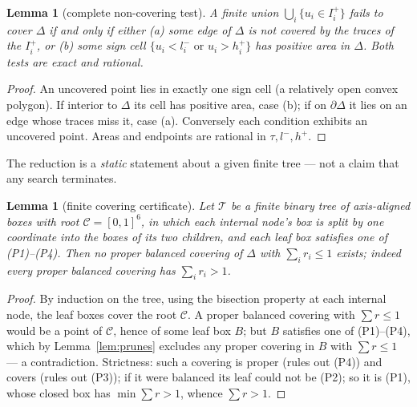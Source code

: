 \documentclass{aims}
\numberwithin{equation}{section}
\theoremstyle{plain}
\newtheorem{lemma}[theorem]{Lemma}
\theoremstyle{definition}
\theoremstyle{remark}
\begin{document}
\begin{lemma}[complete non-covering test]\label{lem:noncover}
A finite union $\bigcup_i\{u_i\in I_i^+\}$ fails to cover $\Delta$ if and only
if either \textup{(a)} some edge of $\Delta$ is not covered by the traces of
the $I_i^+$, or \textup{(b)} some sign cell $\{u_i<l_i^-\text{ or }u_i>h_i^+\}$
has positive area in $\Delta$. Both tests are exact and rational.
\end{lemma}
\begin{proof}
An uncovered point lies in exactly one sign cell (a relatively open convex
polygon). If interior to $\Delta$ its cell has positive area, case (b); if on
$\partial\Delta$ it lies on an edge whose traces miss it, case (a).
Conversely each condition exhibits an uncovered point. Areas and endpoints are
rational in $\tau,l^-,h^+$.
\end{proof}

The reduction is a \emph{static} statement about a given finite tree --- not a
claim that any search terminates.

\begin{lemma}[finite covering certificate]\label{lem:reduction}
Let $\mathcal T$ be a finite binary tree of axis-aligned boxes with root
$\mathcal C=[0,1]^6$, in which each internal node's box is split by one
coordinate into the boxes of its two children, and each leaf box satisfies one
of \textup{(P1)--(P4)}. Then no proper balanced covering of $\Delta$ with
$\sum_i r_i\le1$ exists; indeed every proper balanced covering has
$\sum_i r_i>1$.
\end{lemma}
\begin{proof}
By induction on the tree, using the bisection property at each internal node,
the leaf boxes cover the root $\mathcal C$. A proper balanced covering with
$\sum r\le1$ would be a point of $\mathcal C$, hence of some leaf box $B$; but
$B$ satisfies one of (P1)--(P4), which by Lemma~\ref{lem:prunes} excludes any
proper covering in $B$ with $\sum r\le1$ --- a contradiction. Strictness: such
a covering is proper (rules out (P4)) and covers (rules out (P3)); if it were
balanced its leaf could not be (P2); so it is (P1), whose closed box has
$\min\sum r>1$, whence $\sum r>1$.
\end{proof}
\end{document}
